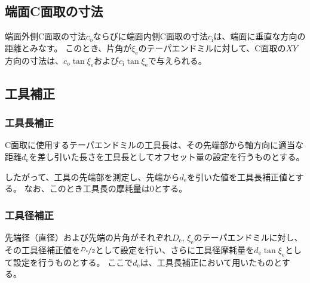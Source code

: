\subsection{端面C面取の寸法}
端面外側C面取の寸法$c_\mathrm o$ならびに端面内側C面取の寸法$c_\mathrm i$は、端面に垂直な方向の距離とみなす。
このとき、片角が$\xi_\mathrm e$のテーパエンドミルに対して、C面取の$XY$方向の寸法は、$c_\mathrm o\tan\xi_\mathrm e$および$c_\mathrm i\tan\xi_\mathrm e$で与えられる。


\subsection{工具補正}

\subsubsection{工具長補正}
C面取に使用するテーパエンドミルの工具長は、その先端部から軸方向に適当な距離$d_\mathrm e$を差し引いた長さを工具長としてオフセット量の設定を行うものとする。

したがって、工具の先端部を測定し、先端から$d_\mathrm e$を引いた値を工具長補正値とする。
なお、このとき工具長の摩耗量は0とする。

\subsubsection{工具径補正}
先端径（直径）および先端の片角がそれぞれ$D_\mathrm e$, $\xi_\mathrm e$のテーパエンドミルに対し、その工具径補正値を$\nicefrac{D_\mathrm e}2$として設定を行い、さらに工具径摩耗量を$d_\mathrm e\tan\xi_\mathrm e$として設定を行うものとする。
ここで$d_\mathrm e$は、工具長補正において用いたものとする。


